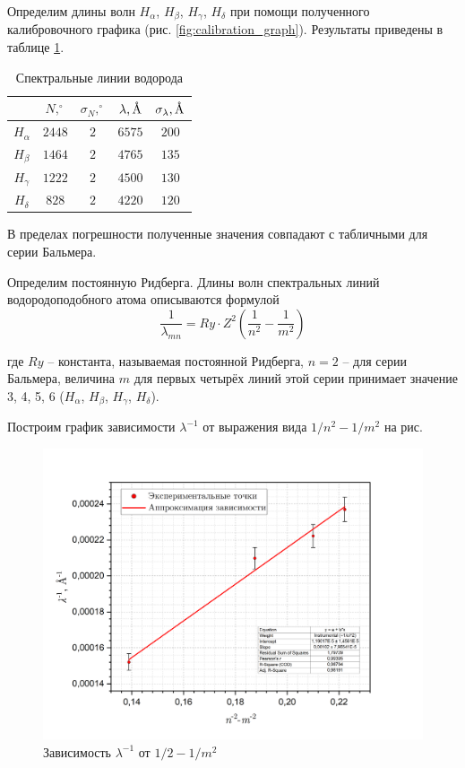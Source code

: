 \documentclass[a4paper, 12pt]{article}
\newcommand{\angstrom}{\text{\normalfont\AA}}
\begin{document}
    Определим длины волн $H_\alpha$, $H_\beta$, $H_\gamma$, $H_\delta$ при помощи полученного калибровочного графика (рис. \ref{fig:calibration_graph}). Результаты приведены в таблице \ref{table:H}.
    
    \begin{table}[H]
        \centering
        \begin{tabular}{|c|c|c|c|c|}
            \hline
            & $N, ^\circ$ & $\sigma_N, ^\circ$ & $\lambda, \angstrom$ & $\sigma_\lambda, \angstrom$ \\ \hline
            $H_\alpha$  & $2448$ & $2$ & $6575$ & $200$ \\ \hline
            $H_\beta $  & $1464$ & $2$ & $4765$ & $135$ \\ \hline
            $H_\gamma$  & $1222$ & $2$ & $4500$ & $130$ \\ \hline
            $H_\delta$  & $828$  & $2$ & $4220$ & $120$ \\ \hline
        \end{tabular}
        \caption{Спектральные линии водорода}
        \label{table:H}
    \end{table}
    
    В пределах погрешности полученные значения совпадают с табличными для серии Бальмера. 
    
    Определим постоянную Ридберга. Длины волн спектральных линий водородоподобного атома описываются формулой
    $$
    \frac{1}{\lambda_{mn}} = Ry \cdot Z^2 \left( \frac{1}{n^2} - \frac{1}{m^2} \right)
    $$

    где $Ry$ -- константа, называемая постоянной Ридберга, $n = 2$ -- для серии Бальмера, величина $m$ для первых четырёх линий этой серии принимает значение 3, 4, 5, 6 ($H_\alpha$, $H_\beta$, $H_\gamma$, $H_\delta$).
    
    
    Построим график зависимости $ \lambda^{-1} $ от выражения вида $ 1/n^2 - 1/m^2 $ на рис.
    
    \begin{figure}[H]
        \centering
        \includegraphics[width = 0.7\linewidth]{images/Ry_graph.png}
        \caption{Зависимость $ \lambda^{-1} $ от $ 1/2 - 1/m^2 $}
        \label{fig:graph3}
    \end{figure}
    
\end{document}
